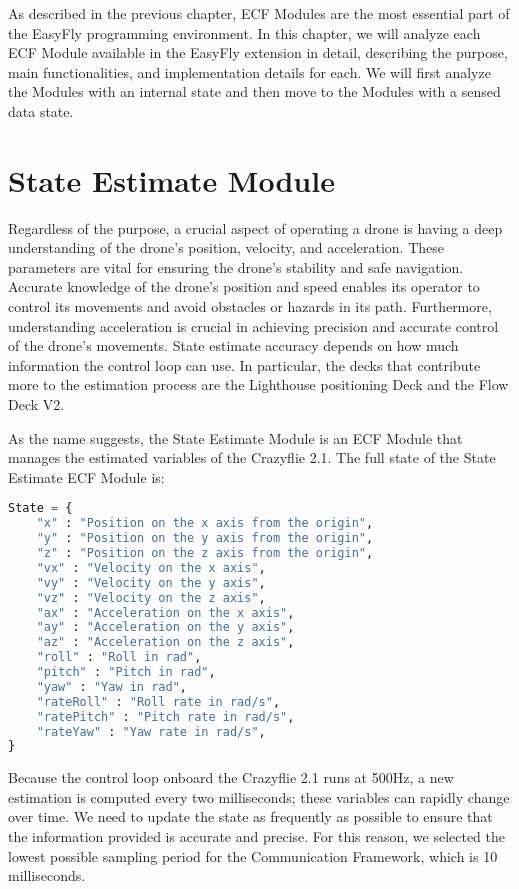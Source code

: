 As described in the previous chapter, ECF Modules are the most essential part of the EasyFly programming environment. 
In this chapter, we will analyze each ECF Module available in the EasyFly extension in detail, describing the purpose, main functionalities, and implementation details for each. 
We will first analyze the Modules with an internal state and then move to the Modules with a sensed data state. 

\section{State Estimate Module}\label{sec:module_state_estimate}

Regardless of the purpose, a crucial aspect of operating a drone is having a deep understanding of the drone's position, velocity, and acceleration. 
These parameters are vital for ensuring the drone's stability and safe navigation. 
Accurate knowledge of the drone's position and speed enables its operator to control its movements and avoid obstacles or hazards in its path. 
Furthermore, understanding acceleration is crucial in achieving precision and accurate control of the drone's movements.
State estimate accuracy depends on how much information the control loop can use. 
In particular, the decks that contribute more to the estimation process are the Lighthouse positioning Deck and the Flow Deck V2. 

As the name suggests, the State Estimate Module is an ECF Module that manages the estimated variables of the Crazyflie 2.1.
The full state of the State Estimate ECF Module is:
\begin{lstlisting}[language=Python]
State = {
    "x" : "Position on the x axis from the origin",
    "y" : "Position on the y axis from the origin",
    "z" : "Position on the z axis from the origin",
    "vx" : "Velocity on the x axis",
    "vy" : "Velocity on the y axis",
    "vz" : "Velocity on the z axis",
    "ax" : "Acceleration on the x axis",
    "ay" : "Acceleration on the y axis",
    "az" : "Acceleration on the z axis",
    "roll" : "Roll in rad",
    "pitch" : "Pitch in rad",
    "yaw" : "Yaw in rad",
    "rateRoll" : "Roll rate in rad/s",
    "ratePitch" : "Pitch rate in rad/s",
    "rateYaw" : "Yaw rate in rad/s",
}
\end{lstlisting}

Because the control loop onboard the Crazyflie 2.1 runs at 500Hz, a new estimation is computed every two milliseconds; these variables can rapidly change over time. 
We need to update the state as frequently as possible to ensure that the information provided is accurate and precise. 
For this reason, we selected the lowest possible sampling period for the Communication Framework, which is 10 milliseconds.


